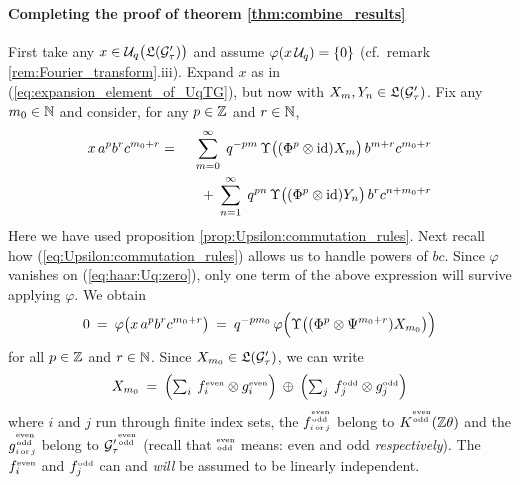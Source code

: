 \paragraph{Completing the proof of theorem \ref{thm:combine_results}}
%
%
First take any $x \in \Uq \!\left(\calL(\Gtau')\vertM\right)$ and assume
$\varphi(x\, {\mathcal U}_q) = \{0\}$ (cf.\ remark \ref{rem:Fourier_transform}.iii).
Expand $x$ as in (\ref{eq:expansion_element_of_UqTG}),
but now with $X_m, Y_n \in \mathfrak{L}(\mathcal G_\tau')$.
Fix any $m_0\in \mathbb{N}$ and consider, for any $p\in \mathbb{Z}$ and $r\in\mathbb{N}$,
\begin{eqnarray*}
x\,a^p b^r c^{m_0+r}
  &=& \hspace{0.5em}
\sum_{m=0}^\infty \;
    q^{-pm}\, \Upsilon\!\left((\Phi^p \tens \id)X_m\vertM\right) b^{m+r} c^{m_0+r}
\\&& \!\!\! + \;
\sum_{n=1}^\infty \; q^{pn}\,
              \Upsilon\!\left((\Phi^p \tens \id)Y_n\vertM\right) b^r c^{n+ m_0 +r}
\end{eqnarray*}
Here we have used proposition \ref{prop:Upsilon:commutation_rules}\@.
Next recall how (\ref{eq:Upsilon:commutation_rules})
allows us to handle powers of $bc$.
Since $\varphi$ vanishes on (\ref{eq:haar:Uq:zero}), only one term of
the above expression will survive applying $\varphi$. We obtain
\begin{equation}\label{eq:Uq:moment_problem}
   0 \: = \: \varphi\!\left(x\,a^p b^r c^{m_0+r}\vertM\right)
     \: = \: q^{-pm_0}\, \varphi\!\left(\Upsilon \!\left((\Phi^p \tens \Psi^{m_0+r})X_{m_0}
                     \vertM  \right)\!\vertL\right)
\end{equation}
for all $p\in \mathbb{Z}$ and $r\in\mathbb{N}$. Since $X_{m_0} \in \mathfrak{L}(\mathcal G_\tau')$, we can write
$$ \textstyle X_{m_0} \:=\:
               \left(\sum_i \: f_i^\scripteven \tens g_i^\scripteven\vertL\right)
   \: \oplus\: \left(\sum_j \:f_j^\scriptodd  \tens g_j^\scriptodd \vertL\right) $$
where $i$ and $j$ run through finite index sets,
the $f_{\scriptscriptstyle i \,{\rm or}\,j}^{\stackrel{\scriptscriptstyle \rm even}{\scriptscriptstyle \! \rm odd}}$ belong to $K^{\stackrel{\scriptscriptstyle \rm even}{\scriptscriptstyle \! \rm odd}}(\mathbb{Z} \theta)$ and
the $g_{\scriptscriptstyle i \,{\rm or}\,j}^{\stackrel{\scriptscriptstyle \rm even}{\scriptscriptstyle \! \rm odd}}$ belong to $\mathcal G_\tau^{\prime \,{\stackrel{\scriptscriptstyle \rm even}{\scriptscriptstyle \! \rm odd}}}$
(recall that ${\stackrel{\scriptscriptstyle \rm even}{\scriptscriptstyle \! \rm odd}}$ means: even and odd {\em respectively\/}).
The $f_i^{\rm \scriptscriptstyle even}$ and $f_j^\scriptodd   \vertM$ can and {\em will\/} be assumed
to be linearly independent.

